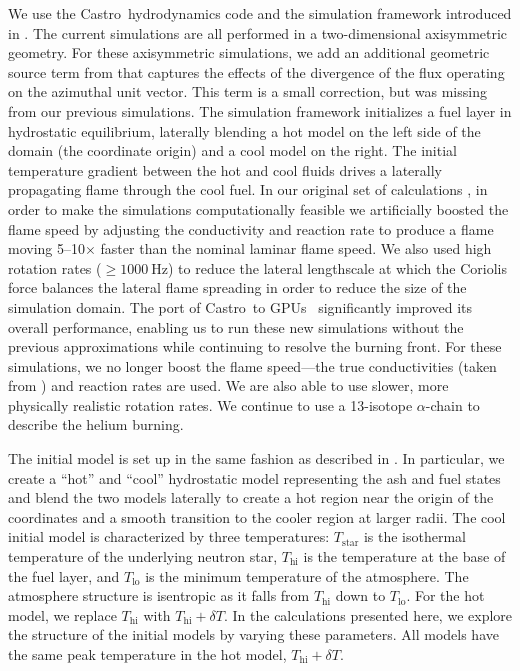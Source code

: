 \documentclass[preprint,times,tighten]{aastex63}
\newcommand{\castro}{{\sf Castro}}
\begin{document}
We use the \castro\ hydrodynamics code \citep{castro,castro_joss} and
the simulation framework introduced in \citet{flame_wave1}.  The
current simulations are all performed in a two-dimensional
axisymmetric geometry.  For these axisymmetric simulations, we add an
additional geometric source term from \citet{bernard-champmartin} that
captures the effects of the divergence of the flux operating on the
azimuthal unit vector.  This term is a small correction, but was
missing from our previous simulations.  The simulation framework
initializes a fuel layer in hydrostatic equilibrium, laterally
blending a hot model on the left side of the domain (the coordinate
origin) and a cool model on the right.  The initial temperature
gradient between the hot and cool fluids drives a laterally
propagating flame through the cool fuel.  In our original set of
calculations \citep{flame_wave1}, in order to make the 
simulations computationally feasible we artificially boosted the flame speed by adjusting the
conductivity and reaction rate to produce a flame moving 5--10$\times$
faster than the nominal laminar flame speed.  We also used high
rotation rates ($\geq 1000~\mathrm{Hz}$) to reduce the lateral lengthscale at which the Coriolis
force balances the lateral flame spreading in order to reduce the size 
of the simulation domain. The port of \castro\ to GPUs~\citep{sc20_gpu} 
significantly improved its overall performance, enabling
us to run these new simulations without the previous approximations while
continuing to resolve the burning front. For these
simulations, we no longer boost the flame speed---the true
conductivities (taken from \citealt{Timmes00}) and reaction rates are
used. We are also able to use slower, more physically realistic rotation rates.
  We continue to use a 13-isotope $\alpha$-chain to describe the
helium burning.  

The initial model is set up in the same fashion as described in
\citet{flame_wave1}.  In particular, we create a ``hot'' and ``cool''
hydrostatic model representing the ash and fuel states and blend the
two models laterally to create a hot region near the origin of the
coordinates and a smooth transition to the cooler region at larger
radii.  The cool initial model is characterized by three temperatures:
$T_\mathrm{star}$ is the isothermal temperature of the underlying
neutron star, $T_\mathrm{hi}$ is the temperature at the base of the
fuel layer, and $T_\mathrm{lo}$ is the minimum temperature of the
atmosphere. The atmosphere structure is isentropic as it falls from
$T_\mathrm{hi}$ down to $T_\mathrm{lo}$.  For the hot model, we
replace $T_\mathrm{hi}$ with $T_\mathrm{hi} + \delta T$.  In the
calculations presented here, we explore the structure of the initial
models by varying these parameters.  All models have the same
peak temperature in the hot model, $T_\mathrm{hi} + \delta T$.
\end{document}
